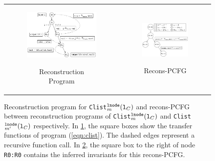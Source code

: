 \begin{figure}[t]
\begin{tabular}{cc}
\begin{subfigure}[b]{0.48\textwidth}
{\includegraphics[scale=0.9]{chapters/figures/figClistCfg.pdf}}
\vspace{5px}
\caption{\label{fig:reconsProg}Reconstruction Program}
\end{subfigure}%
&
\begin{subfigure}[b]{0.52\textwidth}
{\includegraphics[scale=0.9]{chapters/figures/figClistProductCfg.pdf}}
\vspace{22px}
\caption{\label{fig:reconsPCFG}Recons-PCFG}
\end{subfigure}%
\\
\end{tabular}
\caption{\label{fig:recons}Reconstruction program for {\tt Clist}$_m^{\tt lnode}({\tt l}_C)$ and recons-PCFG between reconstruction programs of {\tt Clist}$_m^{\tt lnode}({\tt l}_C)$ and {\tt Clist}$_{m'}^{\tt lnode}({\tt l}_C)$ respectively.
In \cref{fig:reconsProg}, the square boxes show the transfer functions of program (\cref{eqn:clist}). The dashed edges represent a recursive function call. In \cref{fig:reconsPCFG}, the square box to the right of node {\tt R0:R0} contains the inferred invariants for this recons-PCFG.}
\end{figure}
